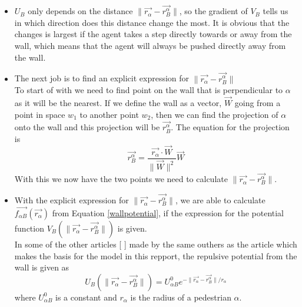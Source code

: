 \begin{itemize}
\item  $U_B$ only depends on the distance $ \| \vec{r_{\alpha}} - \vec{r_{B}^{\alpha}} \|$, so the gradient of $V_B$ tells us in which direction does this distance change the most. It is obvious that the changes is largest if the agent takes a step directly towards or away from the wall, which means that the agent will always be pushed directly away from the wall.

\item The next job is to find an explicit expression for $ \| \vec{r_{\alpha}} - \vec{r_{B}^{\alpha}} \|$\\
To start of with we need to find point on the wall that is perpendicular to $\alpha$ as it will be the nearest.  
If we define the wall as a vector, $\vec{W}$ going from a point in space $w_1$ to another point $w_2$, then we can find the projection of $\alpha$ onto the wall and this projection will be $\vec{r_{B}^{\alpha}}$.
The equation for the projection is
\begin{equation}\label{wall}
\vec{r_{B}^{\alpha}}=\frac{\vec{r_{\alpha}}\cdot \vec{W}}{\| \vec{W} \|^2}\vec{W}
\end{equation}
With this we now have the two points we need to calculate $ \| \vec{r_{\alpha}} - \vec{r_{B}^{\alpha}} \|$.


\item With the explicit expression for $ \| \vec{r_{\alpha}} - \vec{r_{B}^{\alpha}} \| $, we are able to calculate $ \vec{f_{\alpha B}} \left( \vec{r_{\alpha}} \right) $ from Equation \ref{wallpotential}, if the expression for the potential function $ V_{B}
    \left( \| \vec{r_{\alpha}} - \vec{r_{B}^{\alpha}} \| \right) $ is given.\\
In some of the other articles [ ] made by the same outhers as the article which makes the basis for the model in this repport, the repulsive potential from the wall is given as
\begin{equation}
U_{B} \left( \| \vec{r_{\alpha}} - \vec{r_{B}^{\alpha}} \| \right) =
U^0_{\alpha B} e^{- \| \vec{r_{\alpha}} - \vec{r_{B}^{\alpha}} \| / r_{\alpha} }
\end{equation}
where $U^0_{\alpha B}$ is a constant and $r_{\alpha}$ is the radius of a pedestrian $\alpha$. \\


\end{itemize}
